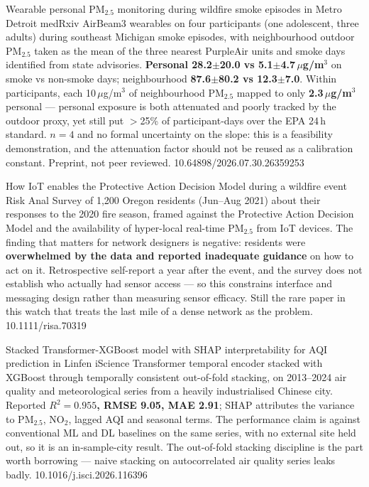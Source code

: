 \documentclass[10pt]{article}
\begin{document}
{Wearable personal PM$_{2.5}$ monitoring during wildfire smoke episodes in Metro Detroit}
{medRxiv}
{AirBeam3 wearables on four participants (one adolescent, three adults) during southeast
Michigan smoke episodes, with neighbourhood outdoor PM$_{2.5}$ taken as the mean of the
three nearest PurpleAir units and smoke days identified from state advisories.
\textbf{Personal 28.2$\pm$20.0 vs 5.1$\pm$4.7\,$\mu$g/m$^3$} on smoke vs non-smoke days;
neighbourhood \textbf{87.6$\pm$80.2 vs 12.3$\pm$7.0}. Within participants, each
10\,$\mu$g/m$^3$ of neighbourhood PM$_{2.5}$ mapped to only \textbf{2.3\,$\mu$g/m$^3$}
personal --- personal exposure is both attenuated and poorly tracked by the outdoor proxy,
yet still put $>$25\% of participant-days over the EPA 24\,h standard. $n=4$ and no
formal uncertainty on the slope: this is a feasibility demonstration, and the attenuation
factor should not be reused as a calibration constant. Preprint, not peer reviewed.}
{10.64898/2026.07.30.26359253}

{How IoT enables the Protective Action Decision Model during a wildfire event}
{Risk Anal}
{Survey of 1{,}200 Oregon residents (Jun--Aug 2021) about their responses to the 2020
fire season, framed against the Protective Action Decision Model and the availability of
hyper-local real-time PM$_{2.5}$ from IoT devices. The finding that matters for network
designers is negative: residents were \textbf{overwhelmed by the data and reported
inadequate guidance} on how to act on it. Retrospective self-report a year after the
event, and the survey does not establish who actually had sensor access --- so this
constrains interface and messaging design rather than measuring sensor efficacy. Still
the rare paper in this watch that treats the last mile of a dense network as the
problem.}
{10.1111/risa.70319}

{Stacked Transformer-XGBoost model with SHAP interpretability for AQI prediction in Linfen}
{iScience}
{Transformer temporal encoder stacked with XGBoost through temporally consistent
out-of-fold stacking, on 2013--2024 air quality and meteorological series from a heavily
industrialised Chinese city. Reported \textbf{$R^2=0.955$, RMSE 9.05, MAE 2.91}; SHAP
attributes the variance to PM$_{2.5}$, NO$_2$, lagged AQI and seasonal terms. The
performance claim is against conventional ML and DL baselines on the same series, with
no external site held out, so it is an in-sample-city result. The out-of-fold stacking
discipline is the part worth borrowing --- naive stacking on autocorrelated air quality
series leaks badly.}
{10.1016/j.isci.2026.116396}
\end{document}
